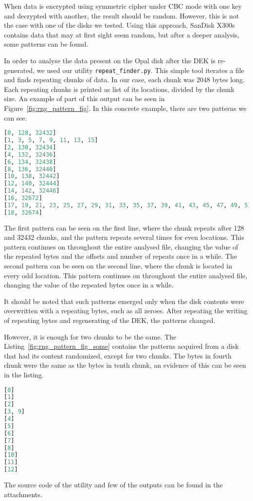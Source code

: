 When data is encrypted using symmetric cipher under CBC mode with one key and decrypted with another, the result should be random.
However, this is not the case with one of the disks we tested. Using this approach, SanDisk X300s contains data that may at first sight seem random, but after a deeper analysis, some patterns can be found.

In order to analyse the data present on the Opal disk after the DEK is re-generated, we used our utility \verb|repeat_finder.py|. This simple tool iterates a file and finds repeating chunks of data. In our case, each chunk was 2048 bytes long. Each repeating chunks is printed as list of its locations, divided by the chunk size. An example of part of this output can be seen in Figure~\ref{fig:rng_pattern_fig}. In this concrete example, there are two patterns we can see.

\begin{lstlisting}[caption={Found patterns on zeroed disk},label={fig:rng_pattern_fig},language=Python]
[0, 128, 32432]
[1, 3, 5, 7, 9, 11, 13, 15]
[2, 130, 32434]
[4, 132, 32436]
[6, 134, 32438]
[8, 136, 32440]
[10, 138, 32442]
[12, 140, 32444]
[14, 142, 32446]
[16, 32672]
[17, 19, 21, 23, 25, 27, 29, 31, 33, 35, 37, 39, 41, 43, 45, 47, 49, 51, 53, 55]
[18, 32674]
    \end{lstlisting}
The first pattern can be seen on the first line, where the chunk repeats after 128 and 32432 chunks, and the pattern repeats several times for even locations. This pattern continues on throughout the entire analysed file, changing the value of the repeated bytes and the offsets and number of  repeats  once in a while.
The second pattern can be seen on the second line, where the chunk is located in every odd location. This pattern continues on throughout the entire analysed file, changing the value of the repeated bytes once in a while.

It should be noted that such patterns emerged only when the disk contents were overwritten with a repeating bytes, such as all zeroes. After repeating the writing of repeating bytes and regenerating of the DEK, the patterns changed. 

However, it is enough for two chunks to be the same. The Listing~\ref{fig:rng_pattern_fig_some} contains the patterns acquired from a disk that had its content randomized, except for two chunks. The bytes in fourth chunk were the same as the bytes in tenth chunk, an evidence of this can be seen in the listing.

\begin{lstlisting}[caption={Found patterns on disk with two same chunks},label={fig:rng_pattern_fig_some},language=Python]
[0]
[1]
[2]
[3, 9]
[4]
[5]
[6]
[7]
[8]
[10]
[11]
[12]
\end{lstlisting}


The source code of the utility and few of the outputs can be found in the attachments.


